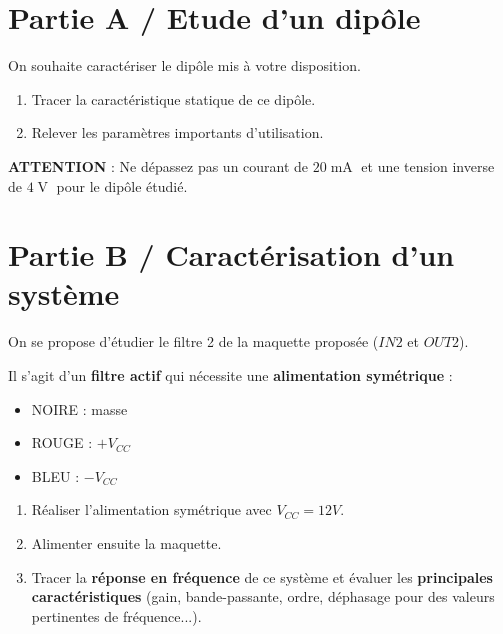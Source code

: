 \documentclass[a4paper]{book}%
\begin{document}
	
	


\cleardoublepage

	 

	\section*{Partie A / Etude d'un dipôle}
	
	On souhaite caractériser le dipôle mis à votre disposition. 

	\begin{enumerate}
		\item Tracer la caractéristique statique de ce dipôle.
		\item Relever les paramètres importants d'utilisation.
	\end{enumerate}

	\noindent \hrulefill

\textbf{ATTENTION} : Ne dépassez pas un courant de $20\operatorname{mA}$ et une tension inverse de $4\operatorname{V}$ pour le dipôle étudié.

	\noindent \hrulefill
	
	\section*{Partie B / Caractérisation d'un système}

On se propose d'étudier le filtre 2 de la maquette proposée ($IN2$ et $OUT2$).

Il s'agit d'un \textbf{filtre actif} qui nécessite une \textbf{alimentation symétrique} : 
\begin{itemize}
	\item NOIRE : masse
	\item ROUGE : $+V_{CC}$
	\item BLEU : $-V_{CC}$
\end{itemize}

\medskip

\begin{enumerate}
	\item Réaliser l'alimentation symétrique avec $V_{CC} = 12V$.
	\item Alimenter ensuite la maquette.	
	\item Tracer la \textbf{réponse en fréquence} de ce système et évaluer les \textbf{principales caractéristiques} (gain, bande-passante, ordre, déphasage pour des valeurs pertinentes de fréquence...).
\end{enumerate}	


\end{document}
